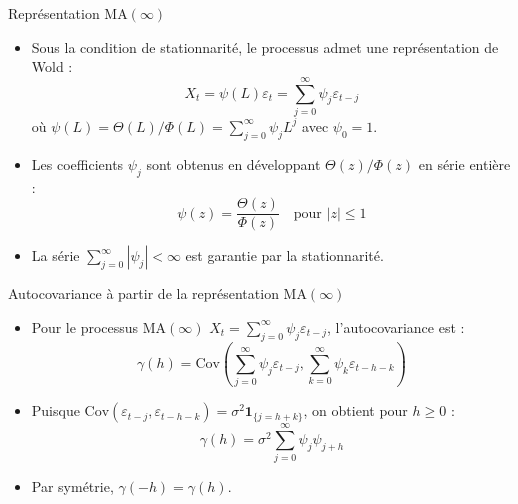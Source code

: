 \documentclass[11pt,aspectratio=169]{beamer}
\newcommand{\Cov}{\mathrm{Cov}}
\begin{document}
\begin{frame}{Représentation MA$(\infty)$}

\begin{itemize}

\item Sous la condition de stationnarité, le processus admet une représentation de Wold :
  \[
  X_t = \psi(L) \varepsilon_t = \sum_{j=0}^{\infty} \psi_j \varepsilon_{t-j}
  \]
  où $\psi(L) = \Theta(L)/\Phi(L) = \sum_{j=0}^{\infty} \psi_j L^j$ avec $\psi_0 = 1$.\newline

\item Les coefficients $\psi_j$ sont obtenus en développant $\Theta(z)/\Phi(z)$ en série entière :
  \[
  \psi(z) = \frac{\Theta(z)}{\Phi(z)} \quad \text{pour } |z| \leq 1
  \]\newline

\item La série $\sum_{j=0}^{\infty} |\psi_j| < \infty$ est garantie par la stationnarité.

\end{itemize}

\end{frame}

\begin{frame}{Autocovariance à partir de la représentation MA$(\infty)$}

\begin{itemize}

\item Pour le processus MA$(\infty)$ $X_t = \sum_{j=0}^{\infty} \psi_j \varepsilon_{t-j}$, l'autocovariance est :
  \[
  \gamma(h) = \Cov\left(\sum_{j=0}^{\infty} \psi_j \varepsilon_{t-j}, \sum_{k=0}^{\infty} \psi_k \varepsilon_{t-h-k}\right)
  \]\newline

\item Puisque $\Cov(\varepsilon_{t-j}, \varepsilon_{t-h-k}) = \sigma^2 \mathbf{1}_{\{j = h+k\}}$, on obtient pour $h \geq 0$ :
  \[
  \gamma(h) = \sigma^2 \sum_{j=0}^{\infty} \psi_j \psi_{j+h}
  \]\newline

\item Par symétrie, $\gamma(-h) = \gamma(h)$.

\end{itemize}

\end{frame}
\end{document}
